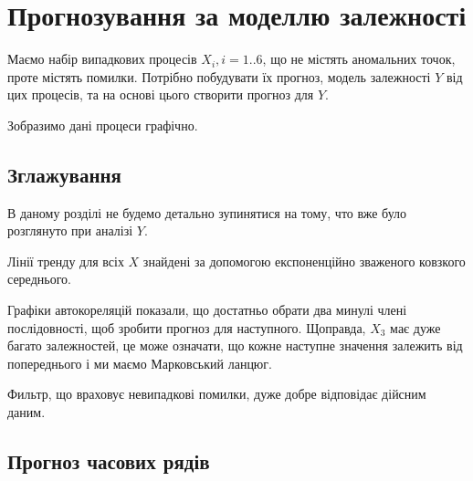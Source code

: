 \chapter{Прогнозування за моделлю залежності}

Маємо набір випадкових процесів $X_i, i=1..6$,
що не містять аномальних точок,
проте містять помилки.
Потрібно побудувати їх прогноз,
модель залежності $Y$ від цих процесів,
та на основі цього створити прогноз для $Y$.

Зобразимо дані процеси графічно.
\begin{center}
\end{center}

\section{Зглажування}

В даному розділі не будемо детально зупинятися на тому,
что вже було розглянуто при аналізі $Y$.

Лінії тренду для всіх $X$ знайдені за допомогою
експоненційно зваженого ковзкого середнього.
\begin{center}
\end{center}

Графіки автокореляцій показали,
що достатньо обрати два минулі члені послідовності,
щоб зробити прогноз для наступного.
Щоправда, $X_3$ має дуже багато залежностей,
це може означати,
що кожне наступне значення залежить від попереднього
і ми маємо Марковський ланцюг.
\begin{center}
\end{center}

Фильтр, що враховує невипадкові помилки,
дуже добре відповідає дійсним даним.
\begin{center}
\end{center}

\section{Прогноз часових рядів}

\begin{center}
\end{center}

